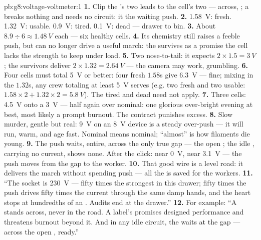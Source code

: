 \begin{solution}{pb:g8:voltage-voltmeter:1}
\textbf{1.} Clip the 's two leads to the cell's two
 --- across, ; a  breaks nothing
and needs no circuit: it  the waiting push.
\textbf{2.} \qty{1.58}{V}: fresh. \qty{1.32}{V}: usable.
\qty{0.9}{V}: tired. \qty{0.1}{V}: dead --- drawer to bin.
\textbf{3.} About $8.9 \div 6 \approx \qty{1.48}{V}$ each ---
six healthy cells.
\textbf{4.} Its chemistry still raises a feeble push, but can no
longer drive a useful march: the  survives as a promise
the cell lacks the strength to keep under load.
\textbf{5.} Two nose-to-tail: it expects $2 \times 1.5 =
\qty{3}{V}$; the survivors deliver $2 \times 1.32 =
\qty{2.64}{V}$ --- the camera may work, grumbling.
\textbf{6.} Four cells must total \qty{5}{V} or better: four
fresh $1.58$s give \qty{6.3}{V} --- fine; mixing in the
$1.32$s, any crew totaling at least \qty{5}{V} serves (e.g.
two fresh and two usable: $1.58 \times 2 + 1.32 \times 2 =
\qty{5.8}{V}$). The tired and dead need not apply.
\textbf{7.} Three cells: \qty{4.5}{V} onto a \qty{3}{V} 
--- half again over nominal: one glorious over-bright evening
at best, most likely a prompt burnout. The contract punishes
excess.
\textbf{8.} Slow murder, gentle but real: \qty{9}{V} on an
\qty{8}{V} device is a steady over-push --- it will run, warm,
and age fast. Nominal means nominal; ``almost'' is how
filaments die young.
\textbf{9.} The  push waits, entire, across the only
true gap --- the open ; the idle , carrying no
current, shows none. After the click:  near \qty{0}{V},
 near \qty{3.1}{V} --- the push moves from the gap to the
worker.
\textbf{10.} That good wire is a level road: it delivers the
march without spending push --- all the  is saved for
the workers.
\textbf{11.} ``The socket is \qty{230}{V} --- fifty times the
strongest  in this drawer; fifty times the push drives
fifty times the current through the same damp hands, and the
heart stops at hundredths of an . Audits end at the
drawer.''
\textbf{12.} For example: ``A  stands across, never
in the road. A label's  promises designed
performance and threatens burnout beyond it. And in any idle
circuit, the  waits at the gap --- across the open
, ready.''
\end{solution}
